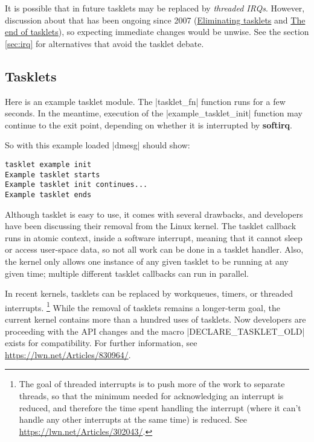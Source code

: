 \documentclass[10pt, oneside]{book}
\begin{document}
It is possible that in future tasklets may be replaced by \textit{threaded IRQs}.
However, discussion about that has been ongoing since 2007 (\href{https://lwn.net/Articles/239633}{Eliminating tasklets} and \href{https://lwn.net/Articles/960041/}{The end of tasklets}),
so expecting immediate changes would be unwise.
See the section \ref{sec:irq} for alternatives that avoid the tasklet debate.

\subsection{Tasklets}
\label{sec:tasklet}
Here is an example tasklet module.
The \cpp|tasklet_fn| function runs for a few seconds.
In the meantime, execution of the \cpp|example_tasklet_init| function may continue to the exit point,
depending on whether it is interrupted by \textbf{softirq}.


So with this example loaded \sh|dmesg| should show:

\begin{verbatim}
tasklet example init
Example tasklet starts
Example tasklet init continues...
Example tasklet ends
\end{verbatim}
Although tasklet is easy to use, it comes with several drawbacks, and developers have been discussing their removal from the Linux kernel.
The tasklet callback runs in atomic context, inside a software interrupt, meaning that it cannot sleep or access user-space data, so not all work can be done in a tasklet handler.
Also, the kernel only allows one instance of any given tasklet to be running at any given time; multiple different tasklet callbacks can run in parallel.

In recent kernels, tasklets can be replaced by workqueues, timers, or threaded interrupts.
\footnote{
The goal of threaded interrupts is to push more of the work to separate threads,
so that the minimum needed for acknowledging an interrupt is reduced,
and therefore the time spent handling the interrupt (where it can't handle any other interrupts at the same time) is reduced.
See \url{https://lwn.net/Articles/302043/}.
}
While the removal of tasklets remains a longer-term goal, the current kernel contains more than a hundred uses of tasklets.
Now developers are proceeding with the API changes and the macro \cpp|DECLARE_TASKLET_OLD| exists for compatibility.
For further information, see \url{https://lwn.net/Articles/830964/}.
\end{document}
